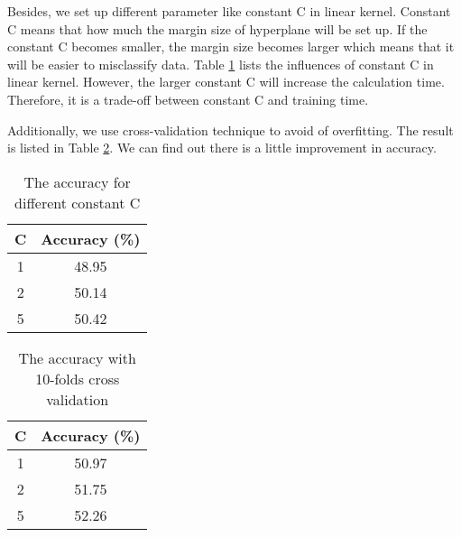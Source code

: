 \documentclass[twocolumn]{article}
\begin{document}
Besides, we set up different parameter like constant C in linear kernel. Constant C means that how much the margin size of hyperplane will be set up. If the constant C becomes smaller, the margin size becomes larger which means that it will be easier to misclassify data. Table \ref{fig:accuracy_constant_c} lists the influences of constant C in linear kernel. However, the larger constant C will increase the calculation time. Therefore, it is a trade-off between constant C and training time.

Additionally, we use cross-validation technique to avoid of overfitting. The result is listed in Table \ref{fig:accuracy_cv}. We can find out there is a little improvement in accuracy.

\begin{table}
    \begin{center}     
        \begin{tabular}{c | c}
            C & Accuracy (\%) \\
            \hline
            1 & 48.95 \\
            2 & 50.14 \\
            5 & 50.42 \\
        \end{tabular}
        \caption{The accuracy for different constant C}
        \label{fig:accuracy_constant_c}
    \end{center}
\end{table}

\begin{table}
    \begin{center}     
        \begin{tabular}{c | c}
            C & Accuracy (\%) \\
            \hline
            1 & 50.97 \\
            2 & 51.75 \\
            5 & 52.26 \\
        \end{tabular}
        \caption{The accuracy with 10-folds cross validation}
        \label{fig:accuracy_cv}
    \end{center}
\end{table}
\end{document}
